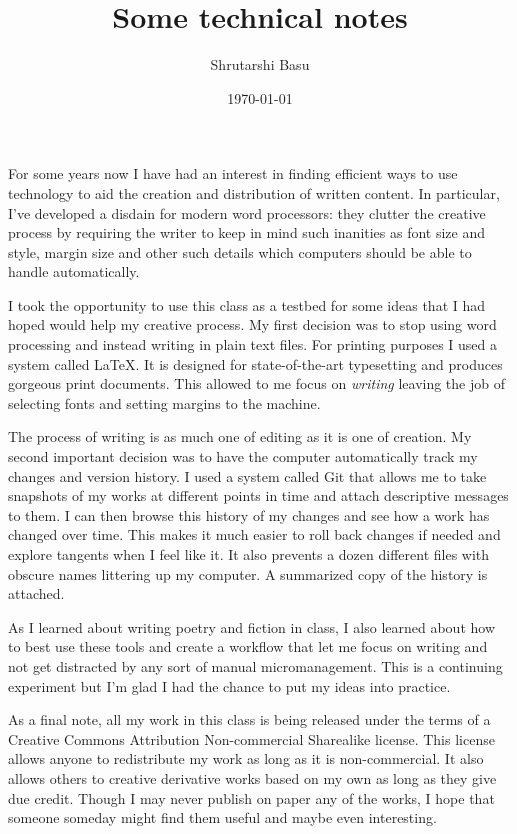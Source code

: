 \documentclass[12pt,letterpaper]{article}
\title{Some technical notes}
\author{Shrutarshi Basu}
\date{\today}
\begin{document}
\maketitle
\doublespacing

For some years now I have had an interest in finding efficient ways to use technology to aid the creation and distribution of written content. In particular, I've developed a disdain for modern word processors: they clutter the creative process by requiring the writer to keep in mind such inanities as font size and style, margin size and other such details which computers should be able to handle automatically.

I took the opportunity to use this class as a testbed for some ideas that I had hoped would help my creative process. My first decision was to stop using word processing and instead writing in plain text files. For printing purposes I used a system called \LaTeX. It is designed for state-of-the-art typesetting and produces gorgeous print documents. This allowed to me focus on \textit{writing} leaving the job of selecting fonts and setting margins to the machine.

The process of writing is as much one of editing as it is one of creation. My second important decision was to have the computer automatically track my changes and version history. I used a system called Git that allows me to take snapshots of my works at different points in time and attach descriptive messages to them. I can then browse this history of my changes and see how a work has changed over time. This makes it much easier to roll back changes if needed and explore tangents when I feel like it. It also prevents a dozen different files with obscure names littering up my computer. A summarized copy of the history is attached.

As I learned about writing poetry and fiction in class, I also learned about how to best use these tools and create a workflow that let me focus on writing and not get distracted by any sort of manual micromanagement. This is a continuing experiment but I'm glad I had the chance to put my ideas into practice.

As a final note, all my work in this class is being released under the terms of a Creative Commons Attribution Non-commercial Sharealike license. This license allows anyone to redistribute my work as long as it is non-commercial. It also allows others to creative derivative works based on my own as long as they give due credit. Though I may never publish on paper any of the works, I hope that someone someday might find them useful and maybe even interesting.

\end{document}
